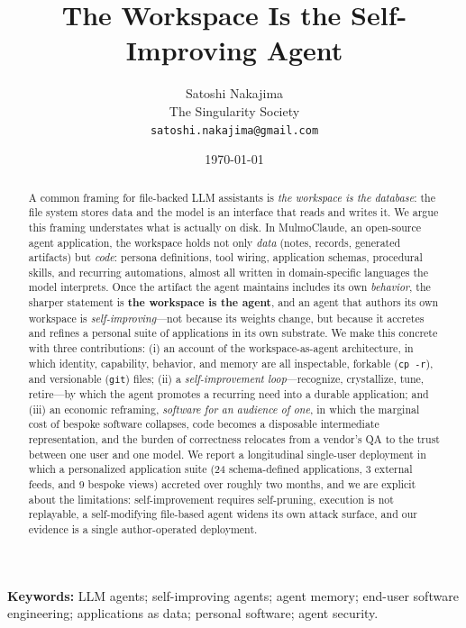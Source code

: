 \documentclass[11pt]{article}
\title{\textbf{The Workspace Is the Self-Improving Agent}}
\author{
  Satoshi Nakajima\\
  \small The Singularity Society\\
  \small \texttt{satoshi.nakajima@gmail.com}
}
\date{\today}
\newcommand{\code}[1]{\texttt{\small #1}}
\begin{document}
\maketitle
\let\thefootnote\relax{}

\begin{abstract}
A common framing for file-backed LLM assistants is \emph{the workspace is the
database}: the file system stores data and the model is an interface that reads and
writes it. We argue this framing understates what is actually on disk. In
MulmoClaude, an open-source agent application, the workspace holds not only
\emph{data} (notes, records, generated artifacts) but \emph{code}: persona
definitions, tool wiring, application schemas, procedural skills, and recurring
automations, almost all written in domain-specific languages the model interprets.
Once the artifact the agent maintains includes its own \emph{behavior}, the sharper
statement is \textbf{the workspace is the agent}, and an agent that authors its own
workspace is \emph{self-improving}---not because its weights change, but because it
accretes and refines a personal suite of applications in its own substrate. We make
this concrete with three contributions: (i) an account of the workspace-as-agent
architecture, in which identity, capability, behavior, and memory are all
inspectable, forkable (\code{cp -r}), and versionable (\code{git}) files; (ii) a
\emph{self-improvement loop}---recognize, crystallize, tune, retire---by which the
agent promotes a recurring need into a durable application; and (iii) an economic
reframing, \emph{software for an audience of one}, in which the marginal cost of
bespoke software collapses, code becomes a disposable intermediate representation,
and the burden of correctness relocates from a vendor's QA to the trust between one
user and one model. We report a longitudinal single-user deployment in which a
personalized application suite (24 schema-defined applications, 3 external feeds,
and 9 bespoke views) accreted over roughly two months, and we are explicit about
the limitations: self-improvement requires self-pruning, execution is not
replayable, a self-modifying file-based agent widens its own attack surface, and
our evidence is a single author-operated deployment.
\end{abstract}

\noindent\textbf{Keywords:} LLM agents; self-improving agents; agent memory;
end-user software engineering; applications as data; personal software; agent
security.
\end{document}
